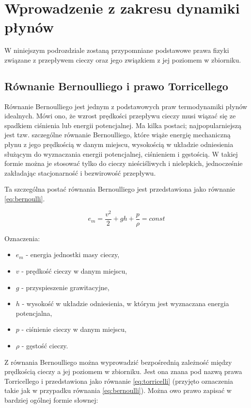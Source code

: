 \section{Wprowadzenie z zakresu dynamiki płynów}
\label{sec:plyny}

W niniejszym podrozdziale zostaną przypomniane podstawowe prawa fizyki związane z przepływem cieczy oraz jego związkiem z jej poziomem w zbiorniku.

\subsection{Równanie Bernoulliego i prawo Torricellego}
\label{sub:plyny-torr}

Równanie Bernoulliego jest jednym z podstawowych praw termodynamiki płynów idealnych. Mówi ono, że wzrost prędkości przepływu cieczy musi wiązać się ze spadkiem ciśnienia lub energii potencjalnej.
Ma kilka postaci; najpopularniejszą jest tzw. szczególne równanie Bernoulliego, które wiąże energię mechaniczną płynu z jego prędkością w danym miejscu, wysokością w układzie odniesienia służącym do wyznaczania energii potencjalnej, ciśnieniem i gęstością.
W takiej formie można je stosować tylko do cieczy nieściśliwych i nielepkich, jednocześnie zakładając stacjonarność i bezwirowość przepływu.

Ta szczególna postać równania Bernoulliego jest przedstawiona jako równanie \ref{eq:bernoulli}.

\begin{equation}\label{eq:bernoulli}
e_{m} = \frac{v^2}{2} + gh + \frac{p}{\rho} = const
\end{equation}

Oznaczenia:
\begin{itemize}
	\item $e_{m}$ - energia jednostki masy cieczy,
	\item $v$ - prędkość cieczy w danym miejscu,
	\item $g$ - przyspieszenie grawitacyjne,
	\item $h$ - wysokość w układzie odniesienia, w którym jest wyznaczana energia potencjalna,
	\item $p$ - ciśnienie cieczy w danym miejscu,
	\item $\rho$ - gęstość cieczy.
\end{itemize}

Z równania Bernoulliego można wyprowadzić bezpośrednią zależność między prędkością cieczy a jej poziomem w zbiorniku. Jest ona znana pod nazwą prawa Torricellego i przedstawiona jako równanie \ref{eq:torricelli} (przyjęto oznaczenia takie jak w przypadku równania \ref{eq:bernoulli}).
Można owo prawo zapisać w bardziej ogólnej formie słownej:

